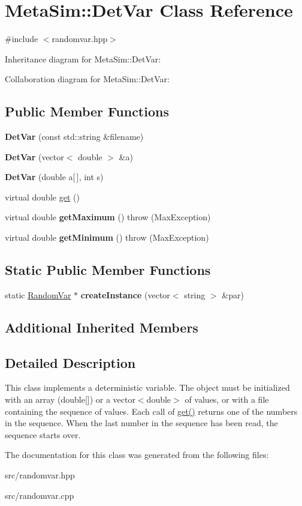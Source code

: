 \hypertarget{classMetaSim_1_1DetVar}{}\section{Meta\+Sim\+:\+:Det\+Var Class Reference}
\label{classMetaSim_1_1DetVar}


{\ttfamily \#include $<$randomvar.\+hpp$>$}



Inheritance diagram for Meta\+Sim\+:\+:Det\+Var\+:


Collaboration diagram for Meta\+Sim\+:\+:Det\+Var\+:
\subsection*{Public Member Functions}
\begin{DoxyCompactItemize}
\item 
{\bfseries Det\+Var} (const std\+::string \&filename)
\item 
{\bfseries Det\+Var} (vector$<$ double $>$ \&a)
\item 
{\bfseries Det\+Var} (double a\mbox{[}$\,$\mbox{]}, int s)
\item 
virtual double \hyperlink{group__metasim__random_ga91b5ba566ff6005e2bdfc18f8691cd85}{get} ()
\item 
virtual double {\bfseries get\+Maximum} ()  throw (\+Max\+Exception)
\item 
virtual double {\bfseries get\+Minimum} ()  throw (\+Max\+Exception)
\end{DoxyCompactItemize}
\subsection*{Static Public Member Functions}
\begin{DoxyCompactItemize}
\item 
static \hyperlink{classMetaSim_1_1RandomVar}{Random\+Var} $\ast$ {\bfseries create\+Instance} (vector$<$ string $>$ \&par)
\end{DoxyCompactItemize}
\subsection*{Additional Inherited Members}


\subsection{Detailed Description}
This class implements a deterministic variable. The object must be initialized with an array (double\mbox{[}\mbox{]}) or a vector$<$double$>$ of values, or with a file containing the sequence of values. Each call of \hyperlink{group__metasim__random_ga91b5ba566ff6005e2bdfc18f8691cd85}{get()} returns one of the numbers in the sequence. When the last number in the sequence has been read, the sequence starts over. 

The documentation for this class was generated from the following files\+:\begin{DoxyCompactItemize}
\item 
src/randomvar.\+hpp\item 
src/randomvar.\+cpp\end{DoxyCompactItemize}
